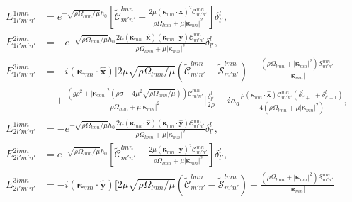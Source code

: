 \documentclass[aps,pre,amsmath,amssymb,floatfix,onecolumn,notitlepage,10pt]{revtex4-1}
\begin{document}
\begin{align}
E_{1l'm'n'}^{1lmn} &= e^ {-\sqrt{{\rho  \Omega _{l m n}}/{\mu }}h_0}\left[ \tilde{\mathcal{C}}_{m' n'}^{l m n}-\frac{2 \mu  \left( \bm{\kappa}_{mn}\cdot\hat{\mathbf{x}} \right)^2 \mathcal{C}_{m' n'}^{m n}}{\rho  \Omega _{l m n}+\mu  \left\lvert \bm{\kappa}_{m n} \right\rvert^2}\right] \delta^l_{l'}, \\
E_{1l'm'n'}^{2lmn} &=-e^ {-\sqrt{{\rho  \Omega _{l m n}}/{\mu }}h_0}\frac{2 \mu  \left( \bm{\kappa}_{mn}\cdot\hat{\mathbf{x}} \right) \left( \bm{\kappa}_{mn}\cdot\hat{\mathbf{y}} \right) \mathcal{C}_{m' n'}^{m n}}{\rho  \Omega _{l m n}+\mu  \left\lvert \bm{\kappa}_{m n} \right\rvert^2} \delta^l_{l'},  \\
E_{1l'm'n'}^{3lmn} &=-i \left( \bm{\kappa}_{mn}\cdot\hat{\mathbf{x}} \right) \Bigg[2 \mu  \sqrt{{\rho  \Omega _{l m n}}/{\mu }} \left(\tilde{\mathcal{C}}_{m' n'}^{l m n}-\tilde{\mathcal{S}}_{m' n'}^{l m n}\right)+\frac{\left( \rho  \Omega _{l m n} +  \left\lvert \bm{\kappa}_{m n} \right\rvert^2 \right) \mathcal{S}_{m' n'}^{m n}}{\left\lvert \bm{\kappa}_{m n} \right\rvert} \nonumber \\
&\quad + \frac{\left(g \rho ^2+\left\lvert \bm{\kappa}_{m n} \right\rvert^2 \left(\rho  \sigma -4 \mu ^2 \sqrt{{\rho  \Omega _{l m n}}/{\mu }}\right)\right)\mathcal{C}_{m' n'}^{m n}}{\rho  \Omega _{l m n}+\mu  \left\lvert \bm{\kappa}_{m n} \right\rvert^2}\Bigg] \frac{\delta^l_{l'}}{2\rho} - i a_d \frac{\rho\left( \bm{\kappa}_{mn}\cdot\hat{\mathbf{x}} \right) \mathcal{C}_{m' n'}^{m n} \left(\delta^l_{l'+1}+\delta^l_{l'-1}\right)}{4\left(\rho  \Omega _{l m n}+\mu  \left\lvert \bm{\kappa}_{m n} \right\rvert^2\right)},  \\
E_{2l'm'n'}^{1lmn} &= -e^ {-\sqrt{{\rho  \Omega _{l m n}}/{\mu }}h_0}\frac{2 \mu  \left( \bm{\kappa}_{mn}\cdot\hat{\mathbf{x}} \right) \left( \bm{\kappa}_{mn}\cdot\hat{\mathbf{y}} \right) \mathcal{C}_{m' n'}^{m n}}{\rho  \Omega _{l m n}+\mu  \left\lvert \bm{\kappa}_{m n} \right\rvert^2} \delta^l_{l'}, \\
E_{2l'm'n'}^{2lmn} &=e^ {-\sqrt{{\rho  \Omega _{l m n}}/{\mu }}h_0}\left[\tilde{\mathcal{C}}_{m' n'}^{l m n}-\frac{2 \mu  \left( \bm{\kappa}_{mn}\cdot\hat{\mathbf{y}} \right)^2 \mathcal{C}_{m' n'}^{m n}}{\rho  \Omega _{l m n}+\mu  \left\lvert \bm{\kappa}_{m n} \right\rvert^2}\right] \delta^l_{l'}, \\
E_{2l'm'n'}^{3lmn} &= -i \left( \bm{\kappa}_{mn}\cdot\hat{\mathbf{y}} \right)  \Bigg[2 \mu  \sqrt{{\rho  \Omega _{l m n}}/{\mu }} \left(\tilde{\mathcal{C}}_{m' n'}^{l m n}-\tilde{\mathcal{S}}_{m' n'}^{l m n}\right)+\frac{\left( \rho  \Omega _{l m n} +  \left\lvert \bm{\kappa}_{m n} \right\rvert^2 \right) \mathcal{S}_{m' n'}^{m n}}{\left\lvert \bm{\kappa}_{m n} \right\rvert} \nonumber \\

\end{align}
\end{document}

